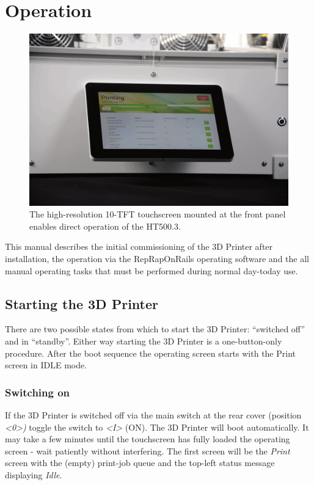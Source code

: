 \section{Operation}

\begin{figure}[H]
  \centering
  \includegraphics[width=.7\linewidth]{./img/touchscreen.png}
  \caption{The high-resolution 10\textquotedbl -TFT touchscreen mounted at the front 
           panel enables direct operation of the HT500.3.}
\end{figure}


This manual describes the initial commissioning of the 3D Printer after installation, the operation via the RepRapOnRails operating software and the all manual operating tasks that must be performed during normal day-today use.

\subsection{Starting the 3D Printer}

There are two possible states from which to start the 3D Printer: “switched off” and in “standby”. Either way starting the 3D Printer is a one-button-only procedure. After the boot sequence the operating screen starts with the Print screen in IDLE mode. 


\subsubsection{Switching on}

If the 3D Printer is switched off via the main switch at the rear cover 
(position \emph{<0>)} toggle the switch to \emph{<I>} (ON).
The 3D Printer will boot automatically.
It may take a few minutes until the touchscreen has fully loaded the operating screen - wait patiently without interfering.
The first screen will be the \emph{Print} screen with the (empty) print-job queue and the top-left status message displaying \emph{Idle}. 

